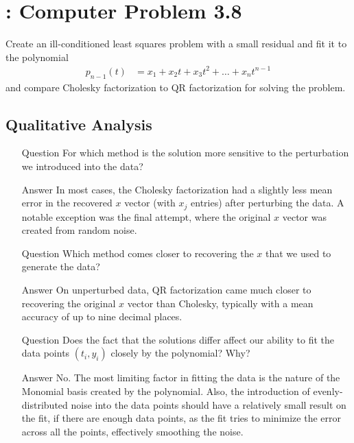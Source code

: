 \documentclass[paper=a4, fontsize=11pt]{scrartcl}
\numberwithin{equation}{section}		%
\numberwithin{figure}{section}			%
\numberwithin{table}{section}				%
\begin{document}
\vspace{4mm}
\section{: Computer Problem 3.8}
Create an ill-conditioned least squares problem with a small residual and fit it to the polynomial
\begin{align}
	p_{n-1}(t) &= x_1 + x_2 t + x_3 t^2 + \dots + x_n t^{n-1}
\end{align}
and compare Cholesky factorization to QR factorization for solving the problem.

\vspace{4mm}
\subsection{Qualitative Analysis}

\begin{enumerate}[(a)]
	\item[Question] For which method is the solution more sensitive to the perturbation we introduced into the data? \vspace{-2mm}
		\item[Answer] In most cases, the Cholesky factorization had a slightly less mean error in the recovered $x$ vector (with $x_j$ entries) after perturbing the data. A notable exception was the final attempt, where the original $x$ vector was created from random noise.
	\item[Question] Which method comes closer to recovering the $x$ that we used to generate the data? \vspace{-2mm}
		\item[Answer] On unperturbed data, QR factorization came much closer to recovering the original $x$ vector than Cholesky, typically with a mean accuracy of up to nine decimal places.
	\item[Question] Does the fact that the solutions differ affect our ability to fit the data points $(t_i, y_i)$ closely by the polynomial? Why? \vspace{-2mm}
		\item[Answer] No. The most limiting factor in fitting the data is the nature of the Monomial basis created by the polynomial. Also, the introduction of evenly-distributed noise into the data points should have a relatively small result on the fit, if there are enough data points, as the fit tries to minimize the error across all the points, effectively smoothing the noise.
\end{enumerate}
\end{document}
